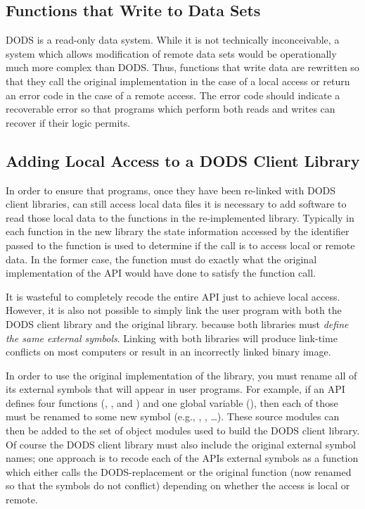 \subsection{Functions that Write to Data Sets}

DODS is a read-only data system. While it is not technically
inconceivable, a system which allows modification of remote data sets
would be operationally much more complex than DODS. Thus, functions
that write data are rewritten so that they call the original
implementation in the case of a local access or return an error code
in the case of a remote access. The error code should indicate a
recoverable error so that programs which perform both reads and writes
can recover if their logic permits.

\subsection{Adding Local Access to a DODS Client Library}

In order to ensure that programs, once they have been re-linked with
DODS client libraries, can still access local data files it is
necessary to add software to read those local data to the functions in
the re-implemented library. Typically in each function in the new
library the state information accessed by the identifier passed to the
function is used to determine if the call is to access local or remote
data. In the former case, the function must do exactly what the
original implementation of the API would have done to satisfy the
function call.

It is wasteful to completely recode the entire API just to achieve
local access.  However, it is also not possible to simply link the
user program with both the DODS client library and the original
library. because both libraries must \emph{define the same external
  symbols}. Linking with both libraries will produce link-time
conflicts on most computers or result in an incorrectly linked binary
image.

In order to use the original implementation of the library, you must
rename all of its external symbols that will appear in user programs.
For example, if an API defines four functions (,
,  and ) and one global variable
(), then each of those must be renamed to some new symbol
(e.g., , , \ldots). These source
modules can then be added to the set of object modules used to build
the DODS client library. Of course the DODS client library must also
include the original external symbol names; one approach is to recode
each of the APIs external symbols as a function which either calls the
DODS-replacement or the original function (now renamed so that the
symbols do not conflict) depending on whether the access is local or
remote.

